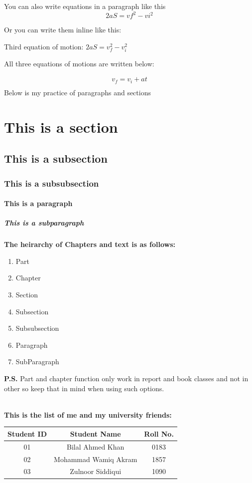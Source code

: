 \documentclass[12pt]{article}
\begin{document}
You can also write equations in a paragraph like this
 \[2aS=vf^2-vi^2\]

Or you can write them inline like this:

Third equation of motion: \(2aS=v_f^2-v_i^2\)

All three equations of motions are written below:

\begin{align}
    v_f =v_i+at\\
\end{align}
\newpage
Below is my practice of paragraphs and sections
\section{This is a section}
\subsection{This is a subsection}
\subsubsection{This is a subsubsection}
\paragraph{This is a paragraph}
\subparagraph{This is a subparagraph}

\textbf{The heirarchy of Chapters and text is as follows:}
\begin{enumerate}
    \item Part
    \item Chapter
    \item Section
    \item Subsection
    \item Subsubsection
    \item Paragraph
    \item SubParagraph
\end{enumerate}
\textbf{P.S.} Part and chapter function only work in report and book classes and not in other so keep that in mind when using such options.

\\[\baselineskip]

\noindent\textbf{This is the list of me and my university friends:}
\begin{center}
{\large \begin{tabular}{||c|c|c||}
    \hline\hline
   Student ID & Student Name & Roll No.\\\hline\hline
    01 & Bilal Ahmed Khan & 0183\\\hline\hline
    02 & Mohammad Wamiq Akram & 1857\\\hline\hline
    03 & Zulnoor Siddiqui & 1090\\\hline\hline
\end{tabular}}
\end{center}
\end{document}
